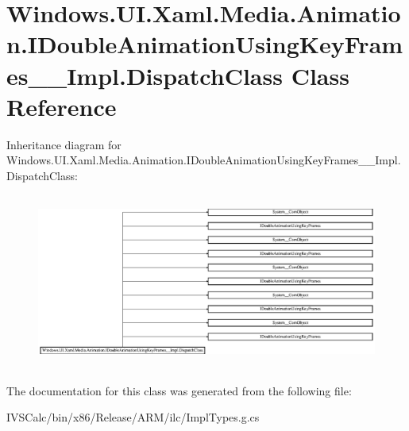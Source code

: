 \hypertarget{class_windows_1_1_u_i_1_1_xaml_1_1_media_1_1_animation_1_1_i_double_animation_using_key_frames_____impl_1_1_dispatch_class}{}\section{Windows.\+U\+I.\+Xaml.\+Media.\+Animation.\+I\+Double\+Animation\+Using\+Key\+Frames\+\_\+\+\_\+\+Impl.\+Dispatch\+Class Class Reference}
\label{class_windows_1_1_u_i_1_1_xaml_1_1_media_1_1_animation_1_1_i_double_animation_using_key_frames_____impl_1_1_dispatch_class}
Inheritance diagram for Windows.\+U\+I.\+Xaml.\+Media.\+Animation.\+I\+Double\+Animation\+Using\+Key\+Frames\+\_\+\+\_\+\+Impl.\+Dispatch\+Class\+:\begin{figure}[H]
\begin{center}
\leavevmode
\includegraphics[height=5.789474cm]{class_windows_1_1_u_i_1_1_xaml_1_1_media_1_1_animation_1_1_i_double_animation_using_key_frames_____impl_1_1_dispatch_class}
\end{center}
\end{figure}


The documentation for this class was generated from the following file\+:\begin{DoxyCompactItemize}
\item 
I\+V\+S\+Calc/bin/x86/\+Release/\+A\+R\+M/ilc/Impl\+Types.\+g.\+cs\end{DoxyCompactItemize}
